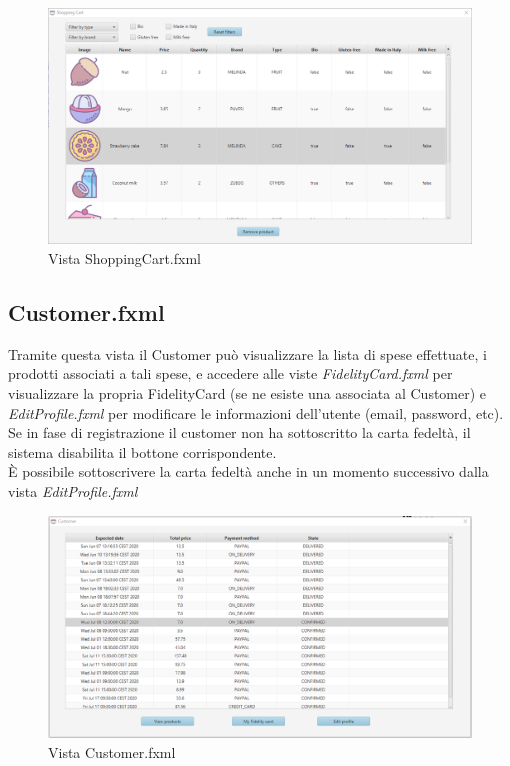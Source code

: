 \documentclass[12pt]{article}
\begin{document}
\begin{figure}[h!]
	\begin{center}
 	 	\includegraphics[width=\textwidth,height=\textheight,keepaspectratio]{media/views/shoppingCart.png}
  	 	 \caption{Vista ShoppingCart.fxml}
	\end{center}
\end{figure}


\clearpage

\subsection{Customer.fxml}
Tramite questa vista il Customer può visualizzare la lista di spese effettuate, i prodotti associati a tali spese, e accedere alle viste \emph{FidelityCard.fxml} per visualizzare la propria FidelityCard (se ne esiste una associata al Customer) e \emph{EditProfile.fxml} per modificare le informazioni dell'utente (email, password, etc).
\\
Se in fase di registrazione il customer non ha sottoscritto la carta fedeltà, il sistema disabilita il bottone corrispondente.
\\
È possibile sottoscrivere la carta fedeltà anche in un momento successivo dalla vista \emph{EditProfile.fxml}

\begin{figure}[h!]
	\begin{center}
 	 	\includegraphics[width=\textwidth,height=\textheight,keepaspectratio]{media/views/customer.png}
  	 	 \caption{Vista Customer.fxml}
	\end{center}
\end{figure}
\end{document}
